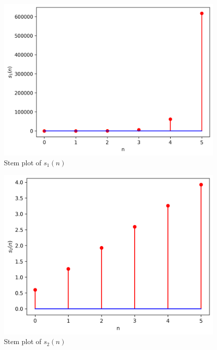 \documentclass[journal,12pt,twocolumn]{IEEEtran}
\theoremstyle{remark}
\begin{document}
\begin{figure}[h!]
    \centering
    \includegraphics[width=\columnwidth]{figs/data_x1.png}
    \caption{Stem plot of $s_1(n)$}
    \label{fig:sr4}
\end{figure}
\begin{figure}[h!]
    \centering
    \includegraphics[width=\columnwidth]{figs/data_x2.png}
    \caption{Stem plot of $s_2(n)$}
    \label{fig:sr7}
\end{figure}
\end{document}
